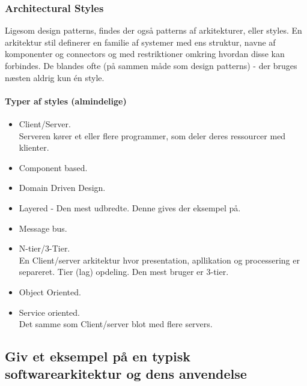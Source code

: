 \subsubsection{Architectural Styles}
Ligesom design patterns, findes der også patterns af arkitekturer, eller styles.
En arkitektur stil definerer en familie af systemer med ens struktur, navne af komponenter og connectors og med restriktioner omkring hvordan disse kan forbindes. De blandes ofte (på sammen måde som design patterns) - der bruges næsten aldrig kun én style.

\paragraph{Typer af styles (almindelige)}

\begin{itemize}
	\item Client/Server.\\
	Serveren kører et eller flere programmer, som deler deres ressourcer med klienter.
	\item Component based.
	\item Domain Driven Design.
	\item Layered - Den mest udbredte. Denne gives der eksempel på.
	\item Message bus.
	\item N-tier/3-Tier.\\
	En Client/server arkitektur hvor presentation, apllikation og processering er separeret. Tier (lag) opdeling. Den mest bruger er 3-tier.
	\item Object Oriented.
	\item Service oriented.\\
	Det samme som Client/server blot med flere servers.
	
\end{itemize}


\subsection{Giv et eksempel på en typisk softwarearkitektur og dens anvendelse}

